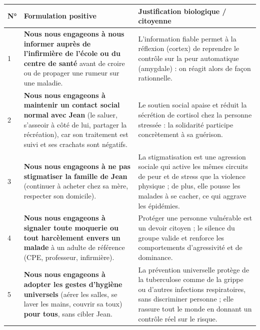 \documentclass[11pt]{article}
\begin{document}
\begin{exoresolu}
\begin{center}
\begin{tabularx}{\linewidth}{|l|X|X|}\hline
\rowcolor{popblueL}
\textbf{N°} & \textbf{Formulation positive} & \textbf{Justification biologique / citoyenne} \\ \hline
1 & \textbf{Nous nous engageons à nous informer auprès de l'infirmière de l'école ou du centre de santé} avant de croire ou de propager une rumeur sur une maladie. & L'information fiable permet à la réflexion (cortex) de reprendre le contrôle sur la peur automatique (amygdale) : on réagit alors de façon rationnelle. \\ \hline
2 & \textbf{Nous nous engageons à maintenir un contact social normal avec Jean} (le saluer, s'asseoir à côté de lui, partager la récréation), car son traitement est suivi et ses crachats sont négatifs. & Le soutien social apaise et réduit la sécrétion de cortisol chez la personne stressée : la solidarité participe concrètement à sa guérison. \\ \hline
3 & \textbf{Nous nous engageons à ne pas stigmatiser la famille de Jean} (continuer à acheter chez sa mère, respecter son domicile). & La stigmatisation est une agression sociale qui active les mêmes circuits de peur et de stress que la violence physique ; de plus, elle pousse les malades à se cacher, ce qui aggrave les épidémies. \\ \hline
4 & \textbf{Nous nous engageons à signaler toute moquerie ou tout harcèlement envers un malade} à un adulte de référence (CPE, professeur, infirmière). & Protéger une personne vulnérable est un devoir citoyen ; le silence du groupe valide et renforce les comportements d'agressivité et de dominance. \\ \hline
5 & \textbf{Nous nous engageons à adopter les gestes d'hygiène universels} (aérer les salles, se laver les mains, couvrir sa toux) \textbf{pour tous}, sans cibler Jean. & La prévention universelle protège de la tuberculose comme de la grippe ou d'autres infections respiratoires, sans discriminer personne ; elle rassure tout le monde en donnant un contrôle réel sur le risque. \\ \hline
\end{tabularx}
\end{center}
\end{exoresolu}
\end{document}
